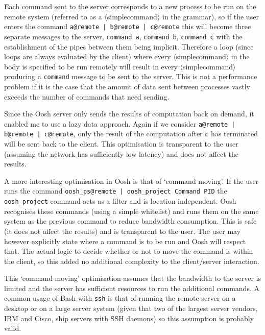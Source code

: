 \documentclass[12pt,twoside,notitlepage]{report}
\begin{document}
Each command sent to the server corresponds to a new process to be run
on the remote system (referred to as a $\langle$simplecommand$\rangle$
in the grammar), so if the user enters the command {\tt a@remote |
  b@remote | c@remote} this will become three separate messages to the
server, {\tt command a}, {\tt command b}, {\tt command c} with the
establishment of the pipes between them being implicit. Therefore a
loop (since loops are always evaluated by the client) where every
$\langle$simplecommand$\rangle$ in the body is specified to be run
remotely will result in every $\langle$simplecommand$\rangle$
producing a {\tt command} message to be sent to the server. This is
not a performance problem if it is the case that the amount of data
sent between processes vastly exceeds the number of commands that need
sending.

Since the Oosh server only sends the results of computation back on
demand, it enabled me to use a lazy data approach. Again if we
consider {\tt a@remote | b@remote | c@remote}, only the result of the
computation after {\tt c} has terminated will be sent back to the
client. This optimisation is transparent to the user (assuming the
network has sufficiently low latency) and does not
affect the results.

A more interesting optimisation in Oosh is that of `command
moving'. If the user runs the command {\tt oosh\_ps@remote |
  oosh\_project Command PID} the {\tt oosh\_project} command acts as a
filter and is location independent. Oosh recognises these commands
(using a simple whitelist) and runs them on the same system as the
previous command to reduce bandwidth consumption. This is safe (it
does not affect the results) and is transparent to the user. The user
may however explicitly state where a command is to be run and Oosh
will respect that. The actual logic to decide whether or not to move
the command is within the client, so this added no additional
complexity to the client/server interaction.

This `command moving' optimisation assumes that the bandwidth to the
server is limited and the server has sufficient resources to run the
additional commands. A common usage of Bash with {\tt ssh} is that of
running the remote server on a desktop or on a large server system (given
that two of the largest server vendors, IBM and Cisco, ship servers
with SSH daemons) so this assumption is probably valid.
\end{document}
